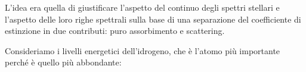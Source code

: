 L'idea era quella di giustificare l'aspetto del continuo degli spettri stellari e l'aspetto delle loro righe spettrali sulla base di una separazione del coefficiente di estinzione in due contributi: puro assorbimento e scattering.



%

Consideriamo i livelli energetici dell'idrogeno, che è l'atomo più importante perché è quello più abbondante:

